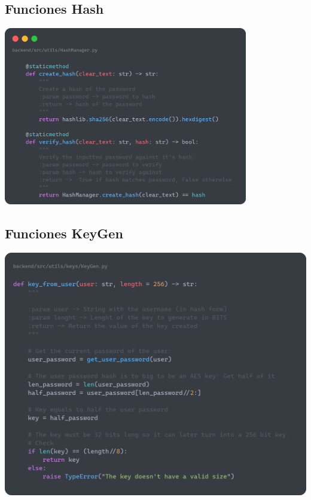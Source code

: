 \documentclass[a4paper,11pt]{article}
\begin{document}
\subsection{Funciones Hash}
    \label{sec:funcionesHash}
    \includegraphics[width=0.8\textwidth]{images/HashFunctions.png} 

\subsection{Funciones KeyGen}
    \label{sec:funcionesKeyGen}
    \includegraphics[width=\textwidth]{images/KeyGen.png}
\end{document}
